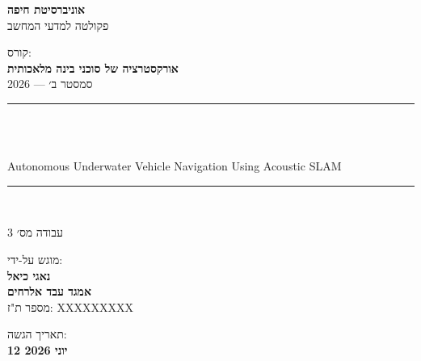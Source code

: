 \begin{titlepage}
    \centering
    \vspace*{1.5cm}

    {\large\textbf{אוניברסיטת חיפה}}\\
    \vspace{0.3em}
    {\normalsize פקולטה למדעי המחשב}\\
    \vspace{1.5cm}

    {\normalsize קורס:}\\
    \vspace{0.2em}
    {\large\textbf{אורקסטרציה של סוכני בינה מלאכותית}}\\
    \vspace{0.2em}
    {\normalsize סמסטר ב׳ --- 2026}\\
    \vspace{1.5cm}

    \rule{\linewidth}{1pt}\\
    \vspace{0.5cm}

    {\LARGE\bfseries {}}\\
    \vspace{0.4em}
    {\large\foreignlanguage{english}{Autonomous Underwater Vehicle Navigation Using Acoustic SLAM}}\\
    \vspace{0.3em}

    \rule{\linewidth}{1pt}\\
    \vspace{1.5cm}

    {\large עבודה מס׳ 3}\\
    \vspace{2cm}

    {\normalsize מוגש על-ידי:}\\
    \vspace{0.5em}
    {\large\textbf{נאגי כיאל}}\\
    \vspace{0.2em}
    {\large\textbf{אמגד עבד אלרחים}}\\
    \vspace{0.2em}
    {\normalsize מספר ת"ז: XXXXXXXXX}\\
    \vspace{1cm}

    \vfill
    {\normalsize תאריך הגשה:}\\
    \vspace{0.2em}
    {\large\textbf{12 יוני 2026}}\\
    \vspace{1cm}
\end{titlepage}
